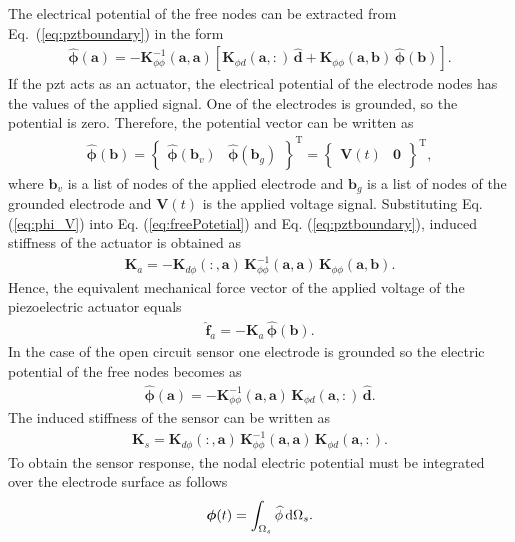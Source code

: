 The electrical potential of the free nodes can be extracted from Eq.~(\ref{eq:pztboundary}) in the form
\begin{eqnarray}
	\widehat{\boldsymbol{\phi}}(\textbf{a}) = -\textbf{K}_{\phi\phi}^{-1}(\textbf{a},\textbf{a})\left[\textbf{K}_{\phi d}(\textbf{a},:)\,\widehat{\textbf{d}} + \textbf{K}_{\phi\phi}(\textbf{a},\textbf{b})\,\widehat{\boldsymbol{\phi}}(\textbf{b}) \right].
	\label{eq:freePotetial}
\end{eqnarray}
If the \ac{pzt} acts as an actuator, the electrical potential of the electrode nodes has the values of the applied signal.
One of the electrodes is grounded, so the potential is zero.
Therefore, the potential vector can be written as
\begin{eqnarray}
	\widehat{\boldsymbol{\phi}}(\textbf{b}) = \left \{\begin{array}{cc}
		\widehat{\boldsymbol{\phi}}(\textbf{b}_v) &
		\widehat{\boldsymbol{\phi}}(\textbf{b}_g)
	\end{array}\right \}^{\mathrm{T}}=\left \{\begin{array}{cc}
	\textbf{V}(t) & \textbf{0}
	\end{array}\right \}^{\mathrm{T}},
	\label{eq:phi_V}
\end{eqnarray}
where \(\textbf{b}_v\) is a list of nodes of the applied electrode and \(\textbf{b}_g\) is a list of nodes of the grounded electrode and \(\textbf{V}(t)\) is the applied voltage signal.
Substituting Eq. (\ref{eq:phi_V}) into Eq. (\ref{eq:freePotetial}) and Eq. (\ref{eq:pztboundary}), induced stiffness of the actuator is obtained as
\begin{eqnarray}
	\textbf{K}_{a}=-\textbf{K}_{d\phi}(:,\textbf{a})\,\textbf{K}_{\phi \phi}^{-1}(\textbf{a},\textbf{a})\,\textbf{K}_{\phi \phi} (\textbf{a},\textbf{b}).
\end{eqnarray}
Hence, the equivalent mechanical force vector of the applied voltage of the piezoelectric actuator equals
\begin{eqnarray}
	\widehat{\textbf{f}}_{a}=-\textbf{K}_{a}\,\widehat{\boldsymbol{\phi}}(\textbf{b}).
	\label{eq:f_act}
\end{eqnarray}
%
In the case of the open circuit sensor one electrode is grounded so the electric potential of the free nodes becomes as
\begin{eqnarray}
	\widehat{\boldsymbol{\phi}}(\textbf{a}) = -\textbf{K}_{\phi\phi}^{-1}(\textbf{a},\textbf{a})\,\textbf{K}_{\phi d}(\textbf{a},:)\,\widehat{\textbf{d}}.
	\label{eq:sensorPotetial}
\end{eqnarray}
The induced stiffness of the sensor can be written as
\begin{eqnarray} \textbf{K}_s=\textbf{K}_{d \phi}(:,\textbf{a})\,\textbf{K}_{\phi \phi}^{-1} (\textbf{a},\textbf{a})\,\textbf{K}_{\phi d}(\textbf{a},:).
\end{eqnarray}
To obtain the sensor response, the nodal electric potential must be integrated over the electrode surface as follows
\begin{eqnarray}
	\boldsymbol{\phi}(t) = \int_{\Omega_s}\widehat{\phi} \mathop{}\!\mathrm{d}\Omega_s.
	\label{eq:sensorResponse}
\end{eqnarray}